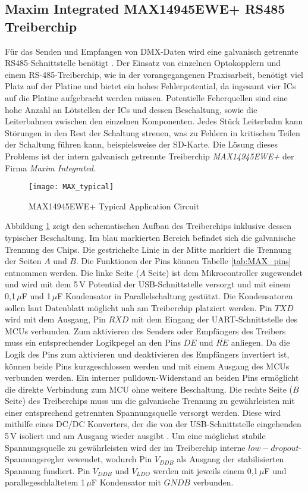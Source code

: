 
\subsection{Maxim Integrated MAX14945EWE+ RS485 Treiberchip}

Für das Senden und Empfangen von DMX-Daten wird eine galvanisch getrennte RS485-Schnittstelle benötigt \cite[s.6-8]{Bauer2021}. Der Einsatz von einzelnen Optokopplern und einem RS-485-Treiberchip, wie in der vorangegangenen Praxisarbeit, benötigt viel Platz auf der Platine und bietet ein hohes Fehlerpotential, da ingesamt vier ICs auf die Platine aufgebracht werden müssen. Potentielle Feherquellen sind eine hohe Anzahl an Lötstellen der ICs und dessen Beschaltung, sowie die Leiterbahnen zwischen den einzelnen Komponenten. Jedes Stück Leiterbahn kann Störungen in den Rest der Schaltung streuen, was zu Fehlern in kritischen Teilen der Schaltung führen kann, beispielsweise der SD-Karte. Die Lösung dieses Problems ist der intern galvanisch getrennte Treiberchip \textit{MAX14945EWE+} der Firma \textit{Maxim Integrated}.
\begin{figure}[h]
	\begin{center}
		\texttt{[image: MAX\_typical]}
		\caption{MAX14945EWE+ Typical Application Circuit \cite[s.19]{MAX14945MN}}
		\label{fig:MAXfd}
	\end{center}
\end{figure}
Abbildung \ref{fig:MAXfd} zeigt den schematischen Aufbau des Treiberchips inklusive dessen typischer Beschaltung. Im blau markierten Bereich befindet sich die galvanische Trennung des Chips. Die gestrichelte Linie in der Mitte markiert die Trennung der Seiten $A$ und $B$. Die Funktionen der Pins können Tabelle \ref{tab:MAX_pins} entnommen werden. Die linke Seite ($A$ Seite) ist dem Mikrocontroller zugewendet und wird mit dem 5\,V Potential der USB-Schnittstelle versorgt und mit einem 0,1\,$\mu$F und 1\,$\mu$F Kondensator in Parallelschaltung gestützt. Die Kondensatoren sollen laut Datenblatt möglicht nah am Treiberchip platziert werden. Pin $TXD$ wird mit dem Ausgang, Pin $RXD$ mit dem Eingang der UART-Schnittstelle des MCUs verbunden. Zum aktivieren des Senders oder Empfängers des Treibers muss ein entsprechender Logikpegel an den Pins $DE$ und $\overline{RE}$ anliegen. Da die Logik des Pins zum aktivieren und deaktivieren des Empfängers invertiert ist, können beide Pins kurzgeschlossen werden und mit einem Ausgang des MCUs verbunden werden. Ein interner pulldown-Widerstand an beiden Pins ermöglicht die direkte Verbindung zum MCU ohne weitere Beschaltung. Die rechte Seite ($B$ Seite) des Treiberchips muss um die galvanische Trennung zu gewährleisten mit einer entsprechend getrennten Spannungsquelle versorgt werden. Diese wird mithilfe eines DC/DC Konverters, der die von der USB-Schnittstelle eingehenden 5\,V isoliert und am Ausgang wieder ausgibt \cite{DC_MN}. Um eine möglichst stabile Spannungsquelle zu gewährleisten wird der im Treiberchip interne $low-dropout$-Spannungsregler vewendet, wodurch Pin $V_{DDB}$ als Ausgang der stabilisierten Spannung fundiert. Pin $V_{DDB}$ und $V_{LDO}$ werden mit jeweils einem 0,1\,$\mu$F und parallegeschlaltetem 1\,$\mu$F Kondensator mit $GNDB$ verbunden.
